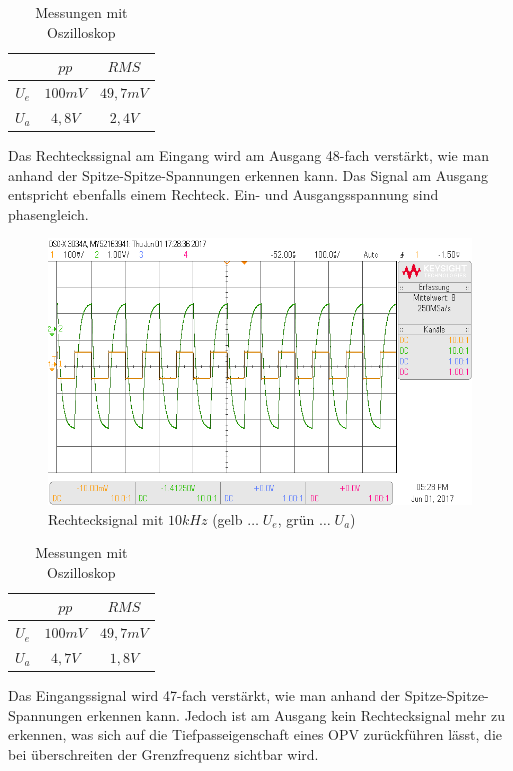 \documentclass[12pt,a4paper,titlepage]{article}
\begin{document}
\begin{table}[H]
  \centering
  \begin{tabular}{c|c|c}
     & $pp$ & $RMS$ \\
     \hline
    $U_{e}$ & $100mV$ & $49,7mV$ \\
    \hline
    $U_{a}$ & $4,8V$ & $2,4V$
  \end{tabular}
  \caption{Messungen mit Oszilloskop}
\end{table}

\noindent Das Rechteckssignal am Eingang wird am Ausgang 48-fach verstärkt, wie man anhand der Spitze-Spitze-Spannungen erkennen kann. Das Signal am Ausgang entspricht ebenfalls einem Rechteck. Ein- und Ausgangsspannung sind phasengleich.

\begin{figure}[H]
  \centering
  \includegraphics[width=150mm]{scope_3.png}
  \caption{Rechtecksignal mit $10kHz$ (gelb $\hdots\;U_e$, grün $\hdots\;U_a$)}
\end{figure}

\begin{table}[H]
  \centering
  \begin{tabular}{c|c|c}
     & $pp$ & $RMS$ \\
     \hline
    $U_{e}$ & $100mV$ & $49,7mV$ \\
    \hline
    $U_{a}$ & $4,7V$ & $1,8V$
  \end{tabular}
  \caption{Messungen mit Oszilloskop}
\end{table}

\noindent Das Eingangssignal wird 47-fach verstärkt, wie man anhand der Spitze-Spitze-Spannungen erkennen kann. Jedoch ist am Ausgang kein Rechtecksignal mehr zu erkennen, was sich auf die Tiefpasseigenschaft eines OPV zurückführen lässt, die bei überschreiten der Grenzfrequenz sichtbar wird.
\end{document}
